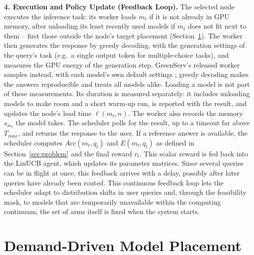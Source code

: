 \textbf{4. Execution and Policy Update (Feedback Loop).}
The selected node executes the inference task: its worker loads $m_t$ if it is not already in GPU memory, after unloading its least recently used models if $m_t$ does not fit next to them -- first those outside the node's target placement (Section~\ref{sec:placement}).
The worker then generates the response by greedy decoding, with the generation settings of the query's task (e.g.\ a single output token for multiple-choice tasks), and measures the GPU energy of the generation step.
GreenServ's released worker samples instead, with each model's own default settings \cite{greenserv_code}; greedy decoding makes the answers reproducible and treats all models alike.
Loading a model is not part of these measurements.
Its duration is measured separately: it includes unloading models to make room and a short warm-up run, is reported with the result, and updates the node's load time $\ell(m_t, n)$.
The worker also records the memory $s_{m_t}$ the model takes.
The scheduler polls for the result, up to a timeout far above $T_{max}$, and returns the response to the user.
If a reference answer is available, the scheduler computes $Acc(m_t, q_t)$ and $E(m_t, q_t)$ as defined in Section~\ref{sec:problem} and the final reward $r_t$.
This scalar reward is fed back into the LinUCB agent, which updates its parameter matrices.
Since several queries can be in flight at once, this feedback arrives with a delay, possibly after later queries have already been routed.
This continuous feedback loop lets the scheduler adapt to distribution shifts in user queries and, through the feasibility mask, to models that are temporarily unavailable within the computing continuum; the set of arms itself is fixed when the system starts.

\section{Demand-Driven Model Placement}
\label{sec:placement}

